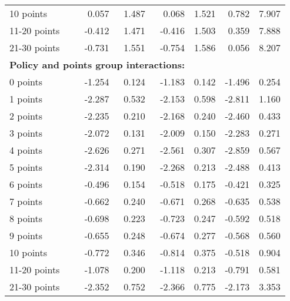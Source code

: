 \begin{table}
\begin{tabular}{l r r r r r r}
10 points  &  0.057  &  1.487  &  0.068  &  1.521  &  0.782  &  7.907   \\ 
 
11-20 points  & -0.412  &  1.471  & -0.416  &  1.503  &  0.359  &  7.888   \\ 
 
21-30 points  & -0.731  &  1.551  & -0.754  &  1.586  &  0.056  &  8.207   \\ 
 

\hline 
 
\multicolumn{4}{l}{\textbf{Policy and points group interactions:}}  \\ 
 
0 points  & -1.254  &  0.124  & -1.183  &  0.142  & -1.496  &  0.254   \\ 
 
1 points  & -2.287  &  0.532  & -2.153  &  0.598  & -2.811  &  1.160   \\ 
 
2 points  & -2.235  &  0.210  & -2.168  &  0.240  & -2.460  &  0.433   \\ 
 
3 points  & -2.072  &  0.131  & -2.009  &  0.150  & -2.283  &  0.271   \\ 
 
4 points  & -2.626  &  0.271  & -2.561  &  0.307  & -2.859  &  0.567   \\ 
 
5 points  & -2.314  &  0.190  & -2.268  &  0.213  & -2.488  &  0.413   \\ 
 
6 points  & -0.496  &  0.154  & -0.518  &  0.175  & -0.421  &  0.325   \\ 
 
7 points  & -0.662  &  0.240  & -0.671  &  0.268  & -0.635  &  0.538   \\ 
 
8 points  & -0.698  &  0.223  & -0.723  &  0.247  & -0.592  &  0.518   \\ 
 
9 points  & -0.655  &  0.248  & -0.674  &  0.277  & -0.568  &  0.560   \\ 
 
10 points  & -0.772  &  0.346  & -0.814  &  0.375  & -0.518  &  0.904   \\ 
 
11-20 points  & -1.078  &  0.200  & -1.118  &  0.213  & -0.791  &  0.581   \\ 
 
21-30 points  & -2.352  &  0.752  & -2.366  &  0.775  & -2.173  &  3.353   \\ 
 

\end{tabular}
\end{table}

